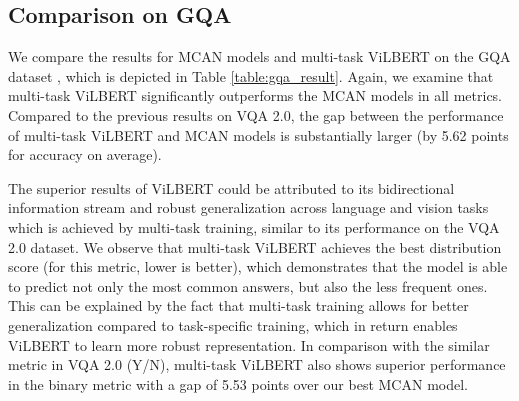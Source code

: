 \documentclass{article}
\begin{document}
\subsection{Comparison on GQA}
We compare the results for MCAN models and multi-task ViLBERT on the GQA dataset \citep{hudson2019gqa}, which is depicted in Table \ref{table:gqa_result}. Again, we examine that multi-task ViLBERT significantly outperforms the MCAN models in all metrics. Compared to the previous results on VQA 2.0, the gap between the performance of multi-task ViLBERT and MCAN models is substantially larger (by 5.62 points for accuracy on average).

The superior results of ViLBERT could be attributed to its bidirectional information stream and robust generalization across language and vision tasks which is achieved by multi-task training, similar to its performance on the VQA 2.0 dataset. We observe that multi-task ViLBERT achieves the best distribution score (for this metric, lower is better), which demonstrates that the model is able to predict not only the most common answers, but also the less frequent ones. This can be explained by the fact that multi-task training allows for better generalization compared to task-specific training, which in return enables ViLBERT to learn more robust representation. In comparison with the similar metric in VQA 2.0 (Y/N), multi-task ViLBERT also shows superior performance in the binary metric with a gap of 5.53 points over our best MCAN model.

\end{document}
